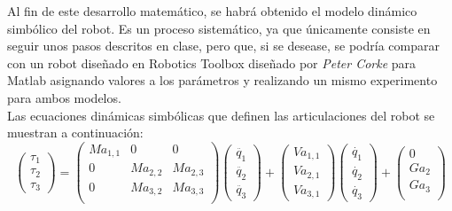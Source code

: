 Al fin de este desarrollo matemático, se habrá obtenido el modelo dinámico simbólico del robot. Es un proceso sistemático, ya que únicamente consiste en seguir unos pasos descritos en clase, pero que, si se desease, se podría comparar con un robot diseñado en Robotics Toolbox diseñado por \textit{Peter Corke} para Matlab asignando valores a los parámetros y realizando un mismo experimento para ambos modelos.\\



Las ecuaciones dinámicas simbólicas que definen las articulaciones del robot se muestran a continuación: \\

\[
\begin{pmatrix}
\tau_{1} \\

\tau_{2} \\

\tau_{3}
\end{pmatrix} =
\begin{pmatrix}
Ma_{1,1} & 0 & 0\\

0 & Ma_{2,2} & Ma_{2,3}\\

0 & Ma_{3,2} & Ma_{3,3}\\
\end{pmatrix}
\begin{pmatrix}
\ddot{q_{1}} \\

\ddot{q_{2}}  \\

\ddot{q_{3}}
\end{pmatrix} +
\begin{pmatrix}
Va_{1,1}\\

Va_{2,1} \\

Va_{3,1}
\end{pmatrix}
\begin{pmatrix}
\dot{q_{1}} \\

\dot{q_{2}}  \\

\dot{q_{3}}
\end{pmatrix} +
\begin{pmatrix}
0\\

Ga_{2}\\

Ga_{3}\\
\end{pmatrix}\]



